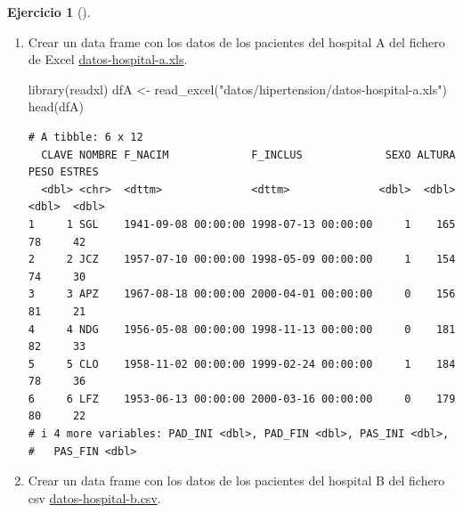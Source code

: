 \documentclass[
  a4paper,
]{scrreport}
\newenvironment{Shaded}{\begin{snugshade}}{\end{snugshade}}
\newcommand{\FunctionTok}[1]{\textcolor[rgb]{0.28,0.35,0.67}{#1}}
\newcommand{\NormalTok}[1]{\textcolor[rgb]{0.00,0.23,0.31}{#1}}
\newcommand{\OtherTok}[1]{\textcolor[rgb]{0.00,0.23,0.31}{#1}}
\newcommand{\StringTok}[1]{\textcolor[rgb]{0.13,0.47,0.30}{#1}}
\theoremstyle{definition}
\newtheorem{exercise}{Ejercicio}[chapter]
\theoremstyle{remark}
\begin{document}
\begin{exercise}[]
\begin{enumerate}
\def\labelenumi{\alph{enumi}.}
\item
  Crear un data frame con los datos de los pacientes del hospital A del
  fichero de Excel
  \href{datos/hipertension/datos-hospital-a.xls}{datos-hospital-a.xls}.

  \begin{tcolorbox}[enhanced jigsaw, breakable, toptitle=1mm, colbacktitle=quarto-callout-tip-color!10!white, rightrule=.15mm, opacityback=0, opacitybacktitle=0.6, titlerule=0mm, coltitle=black, colframe=quarto-callout-tip-color-frame, colback=white, bottomtitle=1mm, leftrule=.75mm, toprule=.15mm, title=\textcolor{quarto-callout-tip-color}{\faLightbulb}\hspace{0.5em}{Solución}, arc=.35mm, bottomrule=.15mm, left=2mm]

\begin{Shaded}
\begin{Highlighting}[]
\FunctionTok{library}\NormalTok{(readxl)}
\NormalTok{dfA }\OtherTok{\textless{}{-}} \FunctionTok{read\_excel}\NormalTok{(}\StringTok{"datos/hipertension/datos{-}hospital{-}a.xls"}\NormalTok{)}
\FunctionTok{head}\NormalTok{(dfA)}
\end{Highlighting}
\end{Shaded}

\begin{verbatim}
# A tibble: 6 x 12
  CLAVE NOMBRE F_NACIM             F_INCLUS             SEXO ALTURA  PESO ESTRES
  <dbl> <chr>  <dttm>              <dttm>              <dbl>  <dbl> <dbl>  <dbl>
1     1 SGL    1941-09-08 00:00:00 1998-07-13 00:00:00     1    165    78     42
2     2 JCZ    1957-07-10 00:00:00 1998-05-09 00:00:00     1    154    74     30
3     3 APZ    1967-08-18 00:00:00 2000-04-01 00:00:00     0    156    81     21
4     4 NDG    1956-05-08 00:00:00 1998-11-13 00:00:00     0    181    82     33
5     5 CLO    1958-11-02 00:00:00 1999-02-24 00:00:00     1    184    78     36
6     6 LFZ    1953-06-13 00:00:00 2000-03-16 00:00:00     0    179    80     22
# i 4 more variables: PAD_INI <dbl>, PAD_FIN <dbl>, PAS_INI <dbl>,
#   PAS_FIN <dbl>
\end{verbatim}

  \end{tcolorbox}
\item
  Crear un data frame con los datos de los pacientes del hospital B del
  fichero csv
  \href{datos/hipertension/datos-hospital-b.csv}{datos-hospital-b.csv}.

  \begin{tcolorbox}[enhanced jigsaw, breakable, toptitle=1mm, colbacktitle=quarto-callout-tip-color!10!white, rightrule=.15mm, opacityback=0, opacitybacktitle=0.6, titlerule=0mm, coltitle=black, colframe=quarto-callout-tip-color-frame, colback=white, bottomtitle=1mm, leftrule=.75mm, toprule=.15mm, title=\textcolor{quarto-callout-tip-color}{\faLightbulb}\hspace{0.5em}{Solución}, arc=.35mm, bottomrule=.15mm, left=2mm]


\end{tcolorbox}
\end{enumerate}
\end{exercise}
\end{document}
